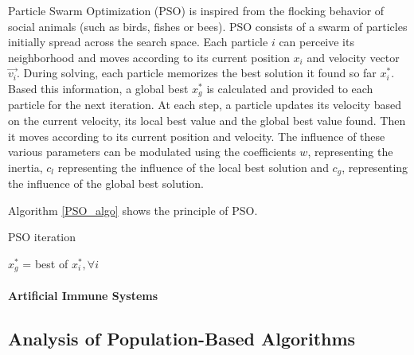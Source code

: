 Particle Swarm Optimization (PSO) is inspired from the flocking behavior of social animals (such as birds, fishes or bees). PSO consists of a swarm of particles initially spread across the search space. Each particle $i$ can perceive its neighborhood and moves according to its current position $x_i$ and velocity vector $\overrightarrow{v_i}$.
During solving, each particle memorizes the best solution it found so far $x_i^*$. Based this information, a global best $x_g^*$ is calculated and provided to each particle for the next iteration.
At each step, a particle updates its velocity based on the current velocity, its local best value and the global best value found. Then it moves according to its current position and velocity. The influence of these various parameters can be modulated using the coefficients $w$, representing the inertia, $c_l$ representing the influence of the local best solution and $c_g$, representing the influence of the global best solution.

Algorithm \ref{PSO_algo} shows the principle of PSO.

\begin{algorithm}
\caption{PSO iteration}\label{PSO_algo}
\begin{algorithmic}

	$x_g^*$ = best of $x_i^*, \forall i$\;

\end{algorithmic}
\end{algorithm}

%
%

\paragraph*{Artificial Immune Systems}

\subsection{Analysis of Population-Based Algorithms}

